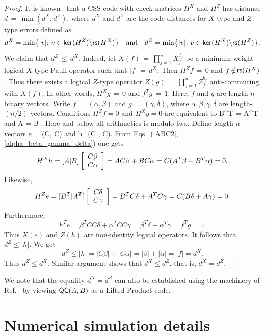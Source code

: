 \documentclass{article}
\begin{document}
\begin{proof}
It is known~\cite{steane1996multiple,calderbank1996good}  that 
a CSS code with check matrices $H^X$ and $H^Z$ has distance
$d\,{=}\,\min{(d^X,d^Z)}$, where 
$d^X$ and $d^Z$ are the code distances for $X$-type and $Z$-type errors
defined as
\[
d^X =  \min\bigl\{ |v|{:} \,\, v\in \ker{H^Z}{\setminus} \rs{H^X} \bigr\}
\quad \mbox{and} \quad
d^Z =  \min\bigl\{ |v|{:} \,\, v\in \ker{H^X}{\setminus} \rs{H^Z} \bigr\}.
\]
We claim that $d^Z\,{\le}\, d^X$.
Indeed, let $X(f)\,{=}\,\prod_{j=1}^n X_j^{f_j}$ be a minimum weight logical $X$-type Pauli operator
such that $|f|\,{=}\,d^X$. 
Then $H^Z f\,{=}\,0$ and $f\,{\notin}\, \rs{H^X}$.
Thus there exists a logical $Z$-type operator $Z(g)\,{=}\,\prod_{j=1}^n Z_j^{g_j}$ anti-commuting with $X(f)$. In other words, $H^X g\,{=}\,0$ and $f^T g \,{=}\, 1$. Here, $f$ and $g$ are length-$n$ binary vectors.
Write $f\,{=}\,(\alpha,\beta)$ and $g\,{=}\,(\gamma, \delta)$, where $\alpha,\beta,\gamma,\delta$ are length-$(n/2)$ vectors.
Conditions $H^Z f =0$ and $H^X g=0$ are equivalent to 
\be
\label{alpha_beta_gamma_delta}
B^T \alpha = A^T \beta \quad \mbox{and} \quad A \gamma = B \delta.
\ee
Here and below all arithmetics is modulo two.
Define length-$n$ vectors 
\be
e = (C\delta, C\gamma) \quad \mbox{and} \quad h=(C \beta, C\alpha).
\ee
From Eqs.~(\ref{ABC2},\ref{alpha_beta_gamma_delta}) one gets
\[
H^X h = [A|B]\left[\ba{c} C \beta \\ C \alpha\\ \ea\right]
=AC\beta+BC\alpha = C(A^T \beta + B^T \alpha) = 0.
\]
Likewise, 
\[
H^Z e = [B^T|A^T]\left[\ba{c} C \delta \\ C \gamma\\ \ea\right]
=B^T C\delta + A^T C\gamma = C(B \delta + A \gamma) = 0.
\]
Furthermore, 
\[
h^T e = \beta^T C C \delta + \alpha^T C C\gamma = \beta^T \delta + \alpha^T \gamma =f^T g=1.
\]
Thus $X(e)$ and $Z(h)$ are non-identity logical operators. 
It follows that $d^Z\le |h|$. We get
\[
d^Z\le |h|=|C\beta|+|C\alpha|=|\beta|+|\alpha|=|f|=d^X.
\]
Thus $d^Z\le d^X$. Similar argument shows that $d^X\le d^Z$, that is, $d^X=d^Z$.
\end{proof}
\noindent
We note that
the equality $d^X=d^Z$ can also be established using the machinery of
Ref.~\cite{panteleev2021quantum} 
by viewing $\qc$ as a Lifted Product code.



\section{Numerical simulation details}\label{sec:numerics}
\end{document}
